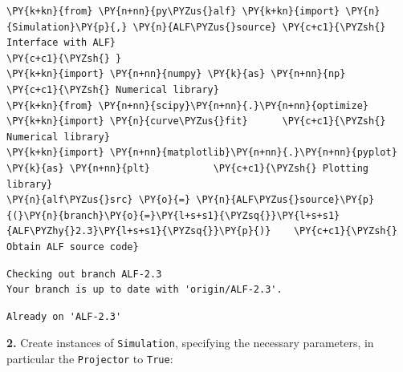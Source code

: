     \begin{tcolorbox}[breakable, size=fbox, boxrule=1pt, pad at break*=1mm,colback=cellbackground, colframe=cellborder]
\begin{Verbatim}[commandchars=\\\{\}]
\PY{k+kn}{from} \PY{n+nn}{py\PYZus{}alf} \PY{k+kn}{import} \PY{n}{Simulation}\PY{p}{,} \PY{n}{ALF\PYZus{}source} \PY{c+c1}{\PYZsh{} Interface with ALF}
\PY{c+c1}{\PYZsh{} }
\PY{k+kn}{import} \PY{n+nn}{numpy} \PY{k}{as} \PY{n+nn}{np}                        \PY{c+c1}{\PYZsh{} Numerical library}
\PY{k+kn}{from} \PY{n+nn}{scipy}\PY{n+nn}{.}\PY{n+nn}{optimize} \PY{k+kn}{import} \PY{n}{curve\PYZus{}fit}      \PY{c+c1}{\PYZsh{} Numerical library}
\PY{k+kn}{import} \PY{n+nn}{matplotlib}\PY{n+nn}{.}\PY{n+nn}{pyplot} \PY{k}{as} \PY{n+nn}{plt}           \PY{c+c1}{\PYZsh{} Plotting library}
\PY{n}{alf\PYZus{}src} \PY{o}{=} \PY{n}{ALF\PYZus{}source}\PY{p}{(}\PY{n}{branch}\PY{o}{=}\PY{l+s+s1}{\PYZsq{}}\PY{l+s+s1}{ALF\PYZhy{}2.3}\PY{l+s+s1}{\PYZsq{}}\PY{p}{)}    \PY{c+c1}{\PYZsh{} Obtain ALF source code}
\end{Verbatim}
\end{tcolorbox}

    \begin{Verbatim}[commandchars=\\\{\}]
Checking out branch ALF-2.3
Your branch is up to date with 'origin/ALF-2.3'.
    \end{Verbatim}

    \begin{Verbatim}[commandchars=\\\{\}]
Already on 'ALF-2.3'
    \end{Verbatim}

    \textbf{2.} Create instances of \texttt{Simulation}, specifying the
necessary parameters, in particular the \texttt{Projector} to
\texttt{True}:

